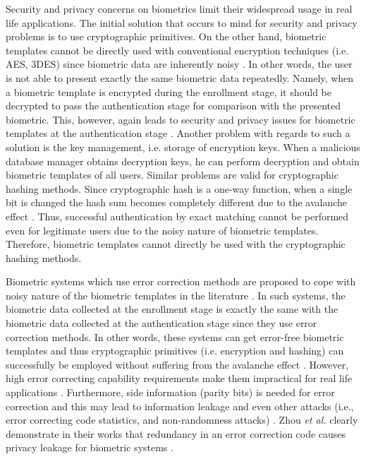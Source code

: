 \documentclass[journal]{IEEEtran}
\begin{document}
Security and privacy concerns on biometrics limit their widespread usage in real life applications. The initial solution that occurs to mind for security and privacy problems is to use cryptographic primitives. On the other hand, biometric templates cannot be directly used with conventional encryption techniques (i.e. AES, 3DES) since biometric data are inherently noisy \cite{Kevenaar}. In other words, the user is not able to present exactly the same biometric data repeatedly. Namely, when a biometric template is encrypted during the enrollment stage, it should be decrypted to pass the authentication stage for comparison with the presented biometric. This, however, again leads to security and privacy issues for biometric templates at the authentication stage \cite{Kevenaar}.  Another problem with regards to such a solution is the key management, i.e. storage of encryption keys. When a malicious database manager obtains decryption keys, he can perform decryption and obtain biometric templates of all users. Similar problems are valid for cryptographic hashing methods. Since cryptographic hash is a one-way function, when a single bit is changed the hash sum becomes completely different due to the avalanche effect \cite{Feistel}. Thus, successful authentication by exact matching cannot be performed even for legitimate users due to the noisy nature of biometric templates. Therefore, biometric templates cannot directly be used with the cryptographic hashing methods. 


Biometric systems which use error correction methods are proposed to cope with noisy nature of the biometric templates in the literature \cite{Hao, Kanade, Juels2}. In such systems, the biometric data collected at the enrollment stage is exactly the same with the biometric data collected at the authentication stage since they use error correction methods. In other words, these systems can get error-free biometric templates and thus cryptographic primitives (i.e. encryption and hashing) can successfully be employed without suffering from the avalanche effect \cite{Davida, Juels2, Tulyakov, Kevenaar}. However, high error correcting capability requirements make them impractical for real life applications \cite{Sutcu2}. Furthermore, side information (parity bits) is needed for error correction and this may lead to information leakage and even other attacks (i.e., error correcting code statistics, and non-randomness attacks) \cite{Stoianov1}. Zhou \textit{et al.} clearly demonstrate in their works that redundancy in an error correction code causes privacy leakage for biometric systems \cite{Zhou, Zhou2}.
\end{document}
